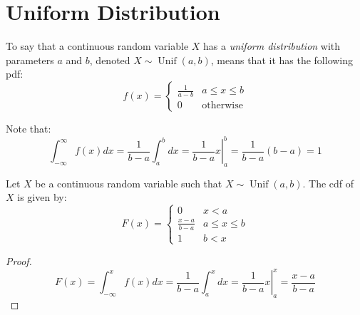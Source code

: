 \documentclass[letterpaper,12pt,fleqn]{article}
\DeclareMathOperator{\unif}{Unif}
\begin{document}
\section*{Uniform Distribution}

\begin{definition}
  To say that a continuous random variable \(X\) has a \emph{uniform distribution} with parameters \(a\) and \(b\), denoted
  \(X\sim\unif(a,b)\), means that it has the following pdf:
  \[f(x)=\begin{cases}
  \frac{1}{a-b} & a\le x\le b \\
  0 & \text{otherwise}
  \end{cases}\]
\end{definition}

Note that:
\[\int_{-\infty}^{\infty}f(x)dx=\frac{1}{b-a}\int_a^bdx=\left.\frac{1}{b-a}x\right|_a^b=\frac{1}{b-a}(b-a)=1\]

\begin{theorem}
  Let \(X\) be a continuous random variable such that \(X\sim\unif(a,b)\).  The cdf of \(X\) is given by:
  \[F(x)=\begin{cases}
  0 & x<a \\
  \frac{x-a}{b-a} & a\le x\le b \\
  1 & b<x
  \end{cases}\]
\end{theorem}

\begin{proof}
  \[F(x)=\int_{-\infty}^xf(x)dx=\frac{1}{b-a}\int_a^xdx=\left.\frac{1}{b-a}x\right|_a^x=\frac{x-a}{b-a}\]
\end{proof}
\end{document}
